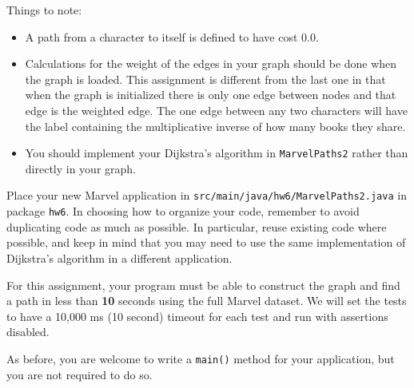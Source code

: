 \documentclass[11pt]{article}
\begin{document}
Things to note:
\begin{itemize}
\item A path from a character to itself is defined to have cost 0.0.
\item Calculations for the weight of the edges in your graph should be done when the graph is loaded. This assignment is different from the last one in that when the graph is initialized there is only one edge between nodes and that edge is the weighted edge. The one edge between any two characters will have the label containing the multiplicative inverse of how many books they share.
\item You should implement your Dijkstra’s algorithm in \texttt{MarvelPaths2} rather than directly in your graph.
\end{itemize}

Place your new Marvel application in \texttt{src/main/java/hw6/MarvelPaths2.java} in package \texttt{hw6}. In choosing how to organize your code, remember to avoid duplicating code as much as possible. In particular, reuse existing code where possible, and keep in mind that you may need to use the same implementation of Dijkstra's algorithm in a different application.

For this assignment, your program must be able to construct the graph and find a path in less than \textbf{10} seconds using the full Marvel dataset. We will set the tests to have a 10,000 ms (10 second) timeout for each test and run with assertions disabled.

As before, you are welcome to write a \texttt{main()} method for your application, but you are not required to do so.
\end{document}
